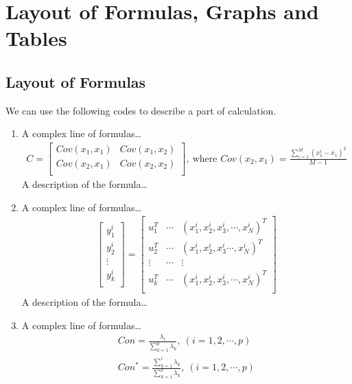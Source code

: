 \section{Layout of Formulas, Graphs and Tables}
\subsection{Layout of Formulas}
We can use the following codes to describe a part of calculation. 

\begin{enumerate}[\bfseries 1.]
    \setlength{\parsep}{0ex} %
    \setlength{\topsep}{0ex} %
    \setlength{\itemsep}{0ex} %
    \item A complex line of formulas\dots
    \begin{align}\label{eq:cov}
        C=\left[ \begin{matrix}
	    Cov\left( x_1,x_1 \right)&		Cov\left( x_1,x_2 \right)\\
	    Cov\left( x_2,x_1 \right)&		Cov\left( x_2,x_2 \right)\\
        \end{matrix} \right] ,\ \text{where\ }Cov\left( x_2,x_1 \right) =\frac{\sum_{i=1}^M{\left( x_{1}^{i}-\overline{x_1} \right) ^2}}{M-1}
    \end{align}
    A description of the formula\dots
   
    \item A complex line of formulas\dots
    \begin{align}
      \left[ \begin{array}{c}
	    y_{1}^{i}\\
	    y_{2}^{i}\\
	    \vdots\\
	    y_{k}^{i}\\
        \end{array} \right] =\left[ \begin{matrix}
	    u_{1}^{T}&		\cdots&		\left( x_{1}^{i},x_{2}^{i},x_{3}^{i},\cdots ,x_{N}^{i} \right) ^T\\
	    u_{2}^{T}&		\cdots&		\left( x_{1}^{i},x_{2}^{i},x_{3}^{i}\cdots ,x_{N}^{i} \right) ^T\\
	    \vdots   &		\cdots&		\vdots\\
	    u_{k}^{T}&		\cdots&		\left( x_{1}^{i},x_{2}^{i},x_{3}^{i},\cdots ,x_{N}^{i} \right) ^T\\
        \end{matrix} \right] 
    \end{align}    
    A description of the formula\dots
    \item A complex line of formulas\dots
    \begin{align}
        Con=\frac{\lambda _i}{\sum_{k=1}^p{\lambda _k}},\ \left( i=1,2,\cdots ,p \right) \\
        Con^*=\frac{\sum_{k=1}^i{\lambda _k}}{\sum_{k=1}^p{\lambda _k}},\ \left( i=1,2,\cdots ,p \right) 
    \end{align}
\end{enumerate}

